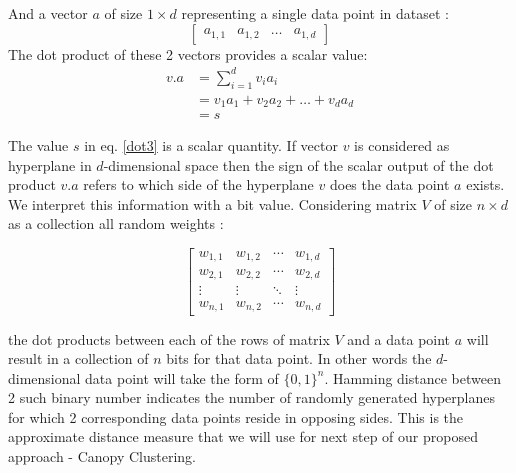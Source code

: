 \documentclass[10pt, conference, compsocconf]{IEEEtran}
\begin{document}
And a vector $a$ of size $1 \times d$ representing a single data point in dataset : 
\begin{equation*}
\begin{bmatrix}
a_{1,1} & a_{1,2} & \hdots & a_{1,d} 
\end{bmatrix}
\end{equation*}      
The dot product of these 2 vectors provides a scalar value:
\begin{align}
\label{dot1}
v\textbf{.}a&=\sum\limits_{i=1}^{d}v_ia_i\\
\label{dot2}
&=v_1a_1+v_2a_2+\hdots+v_da_d\\
\label{dot3}
&=s
\end{align}

The value $s$ in eq. \ref{dot3} is a scalar quantity. If vector $v$ is considered as hyperplane in $d$-dimensional space then the sign of the scalar output of the dot product $v\textbf{.}a$ refers to which side of the hyperplane $v$ does the data point $a$ exists. We interpret this information with a bit value. Considering matrix $V$ of size $n \times d$ as a collection all random weights :    

\begin{equation*}
\begin{bmatrix}
w_{1,1} & w_{1,2} & \cdots & w_{1,d} \\
w_{2,1} & w_{2,2} & \cdots & w_{2,d} \\
\vdots  & \vdots  & \ddots & \vdots  \\
w_{n,1} & w_{n,2} & \cdots & w_{n,d} 
\end{bmatrix}
\end{equation*}

the dot products between each of the rows of matrix $V$ and a data point $a$ will result in a collection of $n$ bits for that data point. In other words the $d$-dimensional data point will take the form of $\{0,1\}^n$. Hamming distance between 2 such binary number indicates the number of randomly generated hyperplanes for which 2 corresponding data points reside in opposing sides. This is the approximate distance measure that we will use for next step of our proposed approach - Canopy Clustering.  
\end{document}

